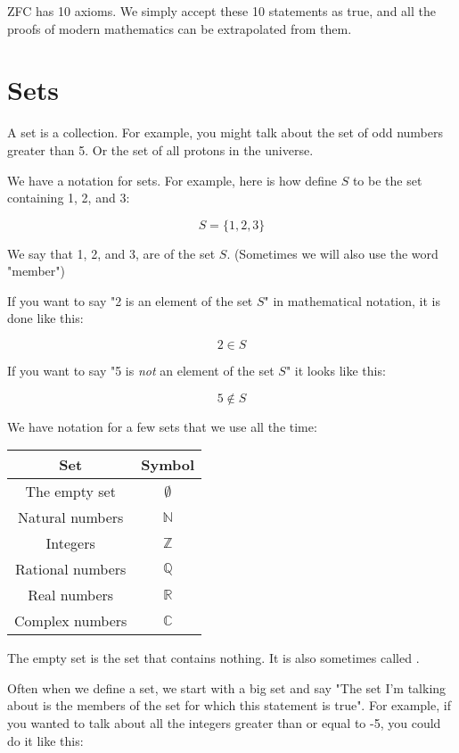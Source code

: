 ZFC has 10 axioms.  We simply accept these 10 statements as true, and
all the proofs of modern mathematics can be extrapolated from them.

\section{Sets}

A set is a collection.  For example, you might talk about the set of
odd numbers greater than 5.  Or the set of all protons in the
universe.  

We have a notation for sets.  For example, here is how define $S$ to
be the set containing 1, 2, and 3:

$$S = \{1, 2, 3\}$$

We say that 1, 2, and 3, are  of the set $S$.
(Sometimes we will also use the word "member")

If you want to say "2 is an element of the set $S$" in mathematical
notation, it is done like this:

$$ 2 \in S$$

If you want to say "5 is \textit{not} an element of the set $S$" it
looks like this:

$$ 5 \notin S$$

We have notation for a few sets that we use all the time:

\begin{tabular}{c|c}
Set & Symbol \\
\hline
The empty set & $\emptyset$ \\ \index{$\emptyset$}
Natural numbers & $\mathbb{N}$ \\ \index{$\mathbb{N}$}
Integers & $\mathbb{Z}$ \\ \index{$\mathbb{Z}$}
Rational numbers & $\mathbb{Q}$ \\ \index{$\mathbb{Q}$}
Real numbers & $\mathbb{R}$ \\ \index{$\mathbb{R}$}
Complex numbers & $\mathbb{C}$ \index{$\mathbb{C}$}
\end{tabular}

The empty set is the set that contains nothing.  It is also sometimes
called .

Often when we define a set, we start with a big set and say "The set
I'm talking about is the members of the set for which this statement
is true".  For example, if you wanted to talk about all the integers
greater than or equal to -5, you could do it like this:

